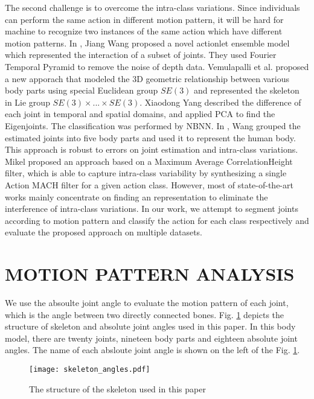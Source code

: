 \documentclass[conference]{IEEEtran}
\begin{document}
The second challenge is to overcome the intra-class variations.
Since individuals can perform the same action in different motion pattern, it will be hard for machine to recognize two instances of the same action which have different motion patterns.
In \cite{learning actionlet ensemble}, Jiang Wang proposed a novel actionlet ensemble model which represented the interaction of a subset of joints.
They used Fourier Temporal Pyramid to remove the noise of depth data.
Vemulapalli et al. \cite{lie_group} proposed a new apporach that modeled the 3D geometric relationship between various body parts using special Euclidean group $ SE(3) $ and represented the skeleton in Lie group $ SE(3) \times...\times SE(3) $.
Xiaodong Yang \cite{Eigenjoints} described the difference of each joint in temporal and spatial domains, and applied PCA to find the Eigenjoints.
The classification was performed by NBNN.
In \cite{pose_based}, Wang grouped the estimated joints into five body parts and used it to represent the human body.
This approach is robust to errors on joint estimation and intra-class variations.
Mikel \cite{MACH} proposed an approach based on a Maximum Average CorrelationHeight filter, which is able to capture intra-class variability by synthesizing a single Action MACH filter for a given action class.
However, most of state-of-the-art works mainly concentrate on finding an representation to eliminate the interference of intra-class variations.
In our work, we attempt to segment joints according to motion pattern and classify the action for each class respectively and evaluate the proposed approach on multiple datasets.

\section{MOTION PATTERN ANALYSIS}
\label{sec:Motion Analysis}
	We use the absoulte joint angle to evaluate the motion pattern of each joint, which is the angle between two directly connected bones.
	Fig. \ref{fig:skeleton_joints} depicts the structure of skeleton and absolute joint angles used in this paper.
	In this body model, there are twenty joints, nineteen body parts and eighteen absolute joint angles.
	The name of each absloute joint angle is shown on the left of the Fig. \ref{fig:skeleton_joints}.
	\begin{figure}[htbp]
		\centering
		\texttt{[image: skeleton\_angles.pdf]}
		\caption{The structure of the skeleton used in this paper}
		\label{fig:skeleton_joints}
	\end{figure}
\end{document}
